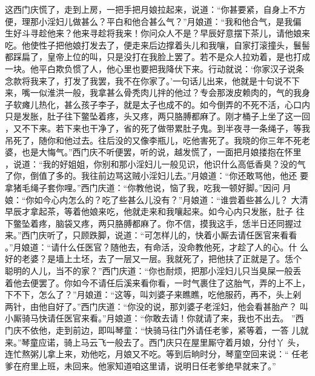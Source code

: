 这西门庆慌了，走到上房，一把手把月娘拉起来，说道：“你甚要紧，自身上不方
便，理那小淫妇儿做甚么？平白和他合甚么气？”月娘道：“我和他合气，是我偏
生好斗寻趁他来？他来寻趁将我来！你问众人不是？早辰好意摆下茶儿，请他娘来
吃。他使性子把他娘打发去了，便走来后边撑着头儿和我嚷，自家打滚撞头，鬟髻
都踩扁了，皇帝上位的叫，只是没打在我脸上罢了。若不是众人拉劝着，是也打成
一块。他平白欺负惯了人，他心里也要把我降伏下来。行动就说：‘你家汉子说条
念款将我来了，打发了我罢，我不在你家了。’一句话儿出来，他就是十句说不下
来，嘴一似淮洪一般，我拿甚么骨秃肉儿拌的他过？专会那泼皮赖肉的，气的我身
子软瘫儿热化，甚么孩子李子，就是太子也成不的。如今倒弄的不死不活，心口内
只是发胀，肚子往下鳖坠着疼，头又疼，两只胳膊都麻了。刚才桶子上坐了这一回
，又不下来。若下来也干净了，省的死了做带累肚子鬼。到半夜寻一条绳子，等我
吊死了，随你和他过去。往后没的又像李瓶儿，吃他害死了。我晓的你三年不死老
婆，也是大悔气。”西门庆不听便罢，听的说，越发慌了，一面把月娘搂抱在怀里
，说道：“我的好姐姐，你别和那小淫妇儿一般见识，他识什么高低香臭？没的气
了你，倒值了多的。我往前边骂这贼小淫妇儿去。”月娘道：“你还敢骂他，他还
要拿猪毛绳子套你哩。”西门庆道：“你教他说，恼了我，吃我一顿好脚。”因问
月娘：“你如今心内怎么的？吃了些甚么儿没有？”月娘道：“谁尝着些甚么儿？
大清早辰才拿起茶，等着他娘来吃，他就走来和我嚷起来。如今心内只发胀，肚子
往下鳖坠着疼，脑袋又疼，两只胳膊都麻了。你不信，摸我这手，恁半日还同握过
来。”西门庆听了，只顾跌脚，说道：“可怎样儿的，快着小厮去请任医官来看看
。”月娘道：“请什么任医官？随他去，有命活，没命教他死，才趁了人的心。什
么好的老婆？是墙上土坯，去了一层又一层。我就死了，把他扶了正就是了。恁个
聪明的人儿，当不的家？”西门庆道：“你也耐烦，把那小淫妇儿只当臭屎一般丢
着他去便罢了。你如今不请任后溪来看你看，一时气裹住了这胎气，弄的上不上，
下不下，怎么了？”月娘道：“这等，叫刘婆子来瞧瞧，吃他服药，再不，头上剁
两针，由他自好了。”西门庆道：“你没的说，那刘婆子老淫妇，他会看甚胎产？
叫小厮骑马快请任医官来看。”月娘道：“你敢去请！你就请了来，我也不出去。
”西门庆不依他，走到前边，即叫琴童：“快骑马往门外请任老爹，紧等着，一答
儿就来。”琴童应诺，骑上马云飞一般去了。西门庆只在屋里厮守着月娘，分付丫
头，连忙熬粥儿拿上来，劝他吃，月娘又不吃。等到后晌时分，琴童空回来说：“
任老爹在府里上班，未回来。他家知道咱这里请，说明日任老爹绝早就来了。”

